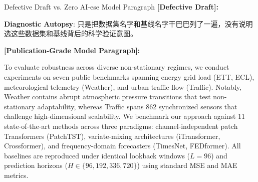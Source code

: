 \begin{ExampleBox}{Defective Draft vs. Zero AI-ese Model Paragraph}
\textbf{\color{TargetHighlight}[Defective Draft]:}\par
{}\par\vspace{4pt}
\textbf{Diagnostic Autopsy}: 只是把数据集名字和基线名字干巴巴列了一遍，没有说明选这些数据集和基线背后的科学验证意图。\par\vspace{6pt}
\textbf{\color{AcadNavy}[Publication-Grade Model Paragraph]:}\par
To evaluate robustness across diverse non-stationary regimes, we conduct experiments on seven public benchmarks spanning energy grid load (ETT, ECL), meteorological telemetry (Weather), and urban traffic flow (Traffic). Notably, Weather contains abrupt atmospheric pressure transitions that test non-stationary adaptability, whereas Traffic spans 862 synchronized sensors that challenge high-dimensional scalability. We benchmark our approach against 11 state-of-the-art methods across three paradigms: channel-independent patch Transformers (PatchTST), variate-mixing architectures (iTransformer, Crossformer), and frequency-domain forecasters (TimesNet, FEDformer). All baselines are reproduced under identical lookback windows ($L=96$) and prediction horizons ($H \in \{96, 192, 336, 720\}$) using standard MSE and MAE metrics.
\end{ExampleBox}
